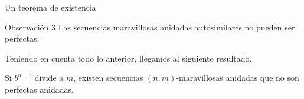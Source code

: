 \documentclass[spanish,xcolor={table}]{beamer}
\begin{document}

\begin{frame}{Un teorema de existencia}

  \begin{block}{Observación 3}
    Las secuencias maravillosas anidadas autosimilares no pueden ser perfectas.
  \end{block}

  \bigskip

  Teniendo en cuenta todo lo anterior, llegamos al siguiente resultado.

  \begin{theorem}
    Si $b^{n-1}$ divide a $m$, existen secuencias $(n,m)$-maravillosas anidadas
    que no son perfectas anidadas.
  \end{theorem}
  
  \end{frame}

\end{document}

